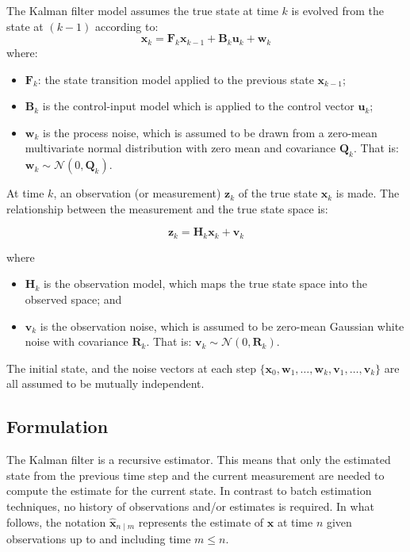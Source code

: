 \documentclass[12pt]{book}
\theoremstyle{definition}
\begin{document}
The Kalman filter model assumes the true state at time $k$ is evolved from the state at $(k - 1)$ according to:
\[
\mathbf{x}_k = \mathbf{F}_k \mathbf{x}_{k-1} + \mathbf{B}_k \mathbf{u}_k + \mathbf{w}_k
\]
where:
\begin{itemize}
    \item $\mathbf{F}_k$: the state transition model applied to the previous state $\mathbf{x}_{k-1}$;
    \item $\mathbf{B}_k$ is the control-input model which is applied to the control vector $\mathbf{u}_k$;
    \item $\mathbf{w}_k$ is the process noise, which is assumed to be drawn from a zero-mean multivariate normal distribution with zero mean and covariance $\mathbf{Q}_k$. That is: $\mathbf{w}_k \sim \mathcal{N}(0,\mathbf{Q}_k)$.
\end{itemize}


At time $k$, an observation (or measurement) $\mathbf{z}_k$ of the true state $\mathbf{x}_k$ is made. The relationship between the measurement and the true state space is: 

\[
\mathbf{z}_k = \mathbf{H}_k \mathbf{x}_k + \mathbf{v}_k
\]

where
\begin{itemize}
    \item $\mathbf{H}_k$ is the observation model, which maps the true state space into the observed space; and
    \item $\mathbf{v}_k$ is the observation noise, which is assumed to be zero-mean Gaussian white noise with covariance $\mathbf{R}_k$. That is: $\mathbf{v}_k \sim \mathcal{N}(0,\mathbf{R}_k)$.

\end{itemize}
The initial state, and the noise vectors at each step $\{\mathbf{x}_0, \mathbf{w}_1, \ldots, \mathbf{w}_k, \mathbf{v}_1, \ldots, \mathbf{v}_k\}$ are all assumed to be mutually independent.

\subsection{Formulation}
The Kalman filter is a recursive estimator. This means that only the estimated state from the previous time step and the current measurement are needed to compute the estimate for the current state. In contrast to batch estimation techniques, no history of observations and/or estimates is required. In what follows, the notation $\hat{\mathbf{x}}_{n\mid m}$ represents the estimate of $\mathbf{x}$ at time $n$ given observations up to and including time $m \leq n$.
\end{document}
